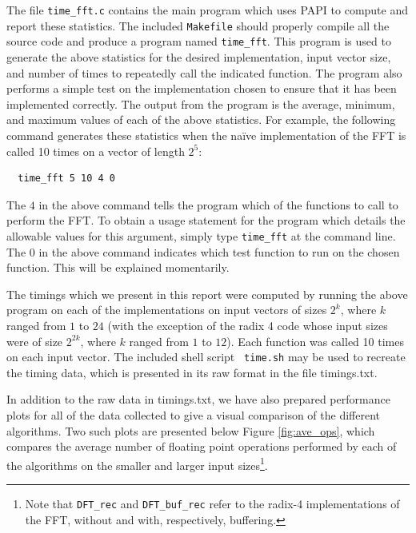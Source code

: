 \documentclass[11 pt]{article}
\begin{document}
The file {\tt time\_fft.c} contains the main program which uses PAPI to compute
and report these statistics.  The included {\tt Makefile} should properly
compile all the source code and produce a program named {\tt time\_fft}.  This
program is used to generate the above statistics for the desired
implementation, input vector size, and number of times to repeatedly call the
indicated function.  The program also performs a simple test on the
implementation chosen to ensure that it has been implemented correctly.  The
output from the program is the average, minimum, and maximum values of each of
the above statistics.  For example, the following command generates these
statistics when the na\"{i}ve implementation of the FFT is called 10 times on a
vector of length $2^5$:
\begin{verbatim}
  time_fft 5 10 4 0
\end{verbatim}
The $4$ in the above command tells the program which of the functions to call
to perform the FFT.  To obtain a usage statement for the program which details
the allowable values for this argument, simply type {\tt time\_fft} at the
command line.  The $0$ in the above command indicates which test function to
run on the chosen function.  This will be explained momentarily.

The timings which we present in this report were computed by running the above
program on each of the implementations on input vectors of sizes $2^k$, where
$k$ ranged from $1$ to $24$ (with the exception of the radix 4 code whose input
sizes were of size $2^{2k}$, where $k$ ranged from $1$ to $12$).  Each function
was called 10 times on each input vector.  The included shell script {\tt
	time.sh} may be used to recreate the timing data, which is presented in its
raw format in the file timings.txt.

In addition to the raw data in timings.txt, we have also prepared performance
plots for all of the data collected to give a visual comparison of the
different algorithms.  Two such plots are presented below Figure
\ref{fig:ave_ops}, which compares the average number of floating point
operations performed by each of the algorithms on the smaller and larger input
sizes\footnote{Note that {\tt DFT\_rec} and {\tt DFT\_buf\_rec} refer to the
	radix-4 implementations of the FFT, without and with, respectively,
	buffering.}.
\end{document}
